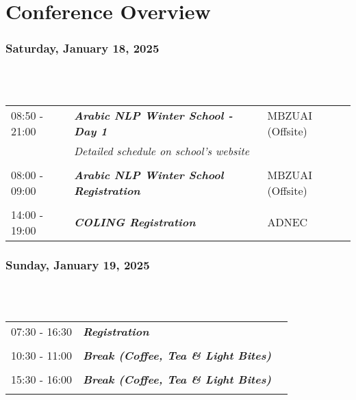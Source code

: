 \chapter{Conference Overview}
\subsection{Saturday, January 18, 2025}
\\
\\
\begin{longtable}{p{15mm}p{60mm}p{30mm}}
{08:50 - 21:00} & \emph{\textbf{Arabic NLP Winter School - Day 1}} & MBZUAI (Offsite) \\
              & \emph{Detailed schedule on school's website}    & \\\\
{08:00 - 09:00} & \emph{\textbf{Arabic NLP Winter School Registration}} &  MBZUAI (Offsite) \\\\
{14:00 - 19:00} & \emph{\textbf{COLING Registration}} & ADNEC
\end{longtable}

\subsection{Sunday, January 19, 2025}
\\
\\
\begin{longtable}{p{15mm}p{60mm}p{30mm}}
{07:30 - 16:30} & \emph{\textbf{Registration}} & \\\\
{10:30 - 11:00} & \emph{\textbf{Break (Coffee, Tea \& Light Bites)}} & \\\\
{15:30 - 16:00} & \emph{\textbf{Break (Coffee, Tea \& Light Bites)}} & \\\\
\end{longtable}

